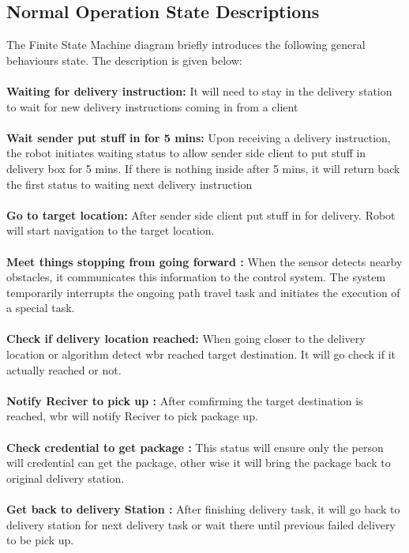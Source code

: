 \documentclass[12pt]{article}
\begin{document}
    \subsection{Normal Operation State Descriptions}    
        The Finite State Machine diagram briefly introduces the following general behaviours state. The description is given below:\\\\
        \noindent\textbf{Waiting for delivery instruction:} It will need to stay in the delivery station to wait for new delivery instructions coming in from a client \\\\
        \noindent\textbf{Wait sender put stuff in for 5 mins:} Upon receiving a  delivery instruction, the robot initiates waiting status to allow sender side client to put stuff in delivery box for 5 mins. If there is nothing inside after 5 mins, it will return back the first status to waiting next delivery instruction\\\\
        \textbf{Go to target location:} After sender side client put stuff in for delivery. Robot will start navigation to the target location. \\\\
        \textbf{Meet things stopping from going forward :} When the sensor detects nearby obstacles, it communicates this information to the control system. The system temporarily interrupts the ongoing path travel task and initiates the execution of a special task.\\\\
        \textbf{Check if delivery location reached:} When going closer to the delivery location or algorithm detect \acrshort{wbr} reached target destination. It will go check if it actually reached or not.\\\\
        \textbf{Notify Reciver to pick up :} After comfirming the target destination is reached, \acrshort{wbr} will notify Reciver to pick package up. \\\\
        \textbf{Check credential to get package :} This status will ensure only the person will credential can get the package, other wise it will bring the package back to original delivery station.  \\\\
        \textbf{Get back to delivery Station :} After finishing delivery task, it will go back to delivery station for next delivery task or wait there until previous failed delivery to be pick up. \\\\
    
\end{document}
